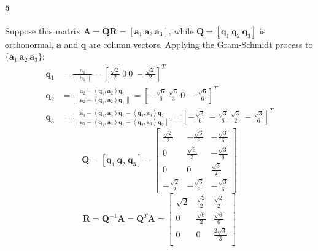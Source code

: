 \documentclass[22pt]{article}
\begin{document}
	\paragraph{5} Suppose this matrix $\mathbf{A} = \mathbf{QR} = [\mathbf{a}_1\ \mathbf{a}_2\ \mathbf{a}_3]$, while $\mathbf{Q} = [\mathbf{q}_1\ \mathbf{q}_2\ \mathbf{q}_3]$ is orthonormal, $\mathbf{a}$ and $\mathbf{q}$ are column vectors. Applying the Gram-Schmidt process to $\{\mathbf{a}_1\ \mathbf{a}_2\ \mathbf{a}_3\}$:
	\begin{align}
		\mathbf{q}_1 & = \frac{\mathbf{a}_1}{\left\|\mathbf{a}_1\right\|} = [\frac{\sqrt{2}}{2}\ 0\ 0\ -\frac{\sqrt{2}}{2}]^T \\
		\mathbf{q}_2 & = \frac{\mathbf{a}_2- \left \langle\mathbf{q}_1,\mathbf{a}_2\right \rangle\mathbf{q}_1}{\left\|\mathbf{a}_2- \left \langle\mathbf{q}_1,\mathbf{a}_2\right \rangle\mathbf{q}_1\right\|} = [-\frac{\sqrt{6}}{6}\ \frac{\sqrt{6}}{3}\ 0\ -\frac{\sqrt{6}}{6}]^T\\
		\mathbf{q}_3 & = \frac{\mathbf{a}_3- \left \langle\mathbf{q}_1,\mathbf{a}_3\right \rangle\mathbf{q}_1-\left \langle\mathbf{q}_2,\mathbf{a}_3\right \rangle\mathbf{q}_2}{\left\|\mathbf{a}_3- \left \langle\mathbf{q}_1,\mathbf{a}_3\right \rangle\mathbf{q}_1-\left \langle\mathbf{q}_2,\mathbf{a}_3\right \rangle\mathbf{q}_2 \right\|} = [-\frac{\sqrt{3}}{6}\ -\frac{\sqrt{3}}{6}\ \frac{\sqrt{3}}{2}\ -\frac{\sqrt{3}}{6}]^T
		\end{align}
	\begin{equation}
	\renewcommand\arraystretch{1.5}
	\mathbf{Q}  = [\mathbf{q}_1\ \mathbf{q}_2\ \mathbf{q}_3] = \left[\begin{array}{ccc} \frac{\sqrt{2}}{2} & -\frac{\sqrt{6}}{6} & -\frac{\sqrt{3}}{6}\\ 0 & \frac{\sqrt{6}}{3} & -\frac{\sqrt{3}}{6} \\ 0&0&\frac{\sqrt{3}}{2}\\ -\frac{\sqrt{2}}{2}&-\frac{\sqrt{6}}{6}& -\frac{\sqrt{3}}{6} \end{array}\right]
		\end{equation}
		\begin{equation}
	\renewcommand\arraystretch{1.5}
	\mathbf{R} = \mathbf{Q}^{-1}\mathbf{A} = \mathbf{Q}^T\mathbf{A} = \left[\begin{array}{ccc} \sqrt{2} &\frac{\sqrt{2}}{2} & \frac{\sqrt{2}}{2} \\ 0 & \frac{\sqrt{6}}{2} & \frac{\sqrt{6}}{6} \\ 0 & 0 & \frac{2\sqrt{3}}{3}\\\end{array}\right]
		\end{equation}
\end{document}
